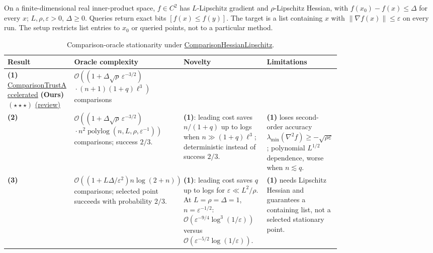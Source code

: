 \begin{table}[tp]
\centering
\caption{Comparison-oracle stationarity under \href{https://github.com/k3nfalt/longtails/blob/main/LongTails/Setups/ComparisonHessianLipschitz.lean}{ComparisonHessianLipschitz}.}\label{tab:ComparisonHessianLipschitz}
\parbox{\linewidth}{\footnotesize On a finite-dimensional real inner-product space, $f\in C^2$ has $L$-Lipschitz gradient and $\rho$-Lipschitz Hessian, with $f(x_0)-f(x)\leq\Delta$ for every $x$; $L,\rho,\varepsilon>0$, $\Delta\geq0$. Queries return exact bits $[f(x)\leq f(y)]$. The target is a list containing $x$ with $\|\nabla f(x)\|\leq\varepsilon$ on every run. The setup restricts list entries to $x_0$ or queried points, not to a particular method.}\par\smallskip
\begin{threeparttable}
\footnotesize
\setlength{\tabcolsep}{4pt}\renewcommand{\arraystretch}{1.25}
\begin{tabularx}{\linewidth}{@{}>{\raggedright\arraybackslash}p{0.20\linewidth}>{\raggedright\arraybackslash}p{0.32\linewidth}>{\raggedright\arraybackslash}p{0.25\linewidth}>{\raggedright\arraybackslash}X@{}}
\toprule
\textbf{Result} & \textbf{Oracle complexity} & \textbf{Novelty} & \textbf{Limitations} \\
\midrule
\textbf{(1)} \href{https://github.com/k3nfalt/longtails/blob/main/LongTails/Theorems/ComparisonTrustAccelerated.lean}{Comparison\allowbreak Trust\allowbreak Accelerated} \textbf{(Ours)} $(\star\star\star)$ \href{https://github.com/k3nfalt/longtails/blob/main/scripts/reviews/ComparisonTrustAccelerated.md}{(review)} & $\mathcal{O}\!\left((1+\Delta\sqrt\rho\,\varepsilon^{-3/2})\right.$\newline $\left.{}\cdot(n+1)(1+q)\ell^3\right)$ comparisons & & \\
\midrule[1.2pt]
\textbf{(2)} \citep[Thm.~8, v1]{chltWang2026} & $\mathcal{O}\!\left((1+\Delta\sqrt\rho\,\varepsilon^{-3/2})\right.$\newline $\left.{}\cdot n^2\operatorname{polylog}(n,L,\rho,\varepsilon^{-1})\right)$ comparisons; success $2/3$. & \textbf{(1)}: leading cost saves $n/(1+q)$ up to logs when $n\gg(1+q)\ell^3$; deterministic instead of success $2/3$. & \textbf{(1)} loses second-order accuracy $\lambda_{\min}(\nabla^2 f)\geq-\sqrt{\rho\varepsilon}$; polynomial $L^{1/2}$ dependence, worse when $n\lesssim q$. \\
\midrule
\textbf{(3)} \citep[Thm.~4, v1]{csZhangLi2024v1} & $\mathcal{O}\!\left((1+L\Delta/\varepsilon^2)n\log(2+n)\right)$ comparisons; selected point succeeds with probability $2/3$. & \textbf{(1)}: leading cost saves $q$ up to logs for $\varepsilon\ll L^2/\rho$. At $L=\rho=\Delta=1$, $n=\varepsilon^{-1/2}$: $\mathcal{O}(\varepsilon^{-9/4}\log^3(1/\varepsilon))$ versus $\mathcal{O}(\varepsilon^{-5/2}\log(1/\varepsilon))$. & \textbf{(1)} needs Lipschitz Hessian and guarantees a containing list, not a selected stationary point. \\

\end{tabularx}
\end{threeparttable}
\end{table}

